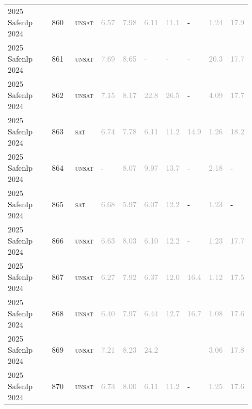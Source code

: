 \begin{center}
{\begin{longtable}{@{}llllllllll@{}}
2025 Safenlp 2024 & 860 & ~\textsc{unsat} & \textcolor{darkgray}{6.57} & \textcolor{darkgray}{7.98} & \textcolor{darkgray}{6.11} & \textcolor{darkgray}{11.1} & - & \textcolor{darkgray}{1.24} & \textcolor{darkgray}{17.9} \\
2025 Safenlp 2024 & 861 & ~\textsc{unsat} & \textcolor{darkgray}{7.69} & \textcolor{darkgray}{8.65} & - & - & - & \textcolor{darkgray}{20.3} & \textcolor{darkgray}{17.7} \\
2025 Safenlp 2024 & 862 & ~\textsc{unsat} & \textcolor{darkgray}{7.15} & \textcolor{darkgray}{8.17} & \textcolor{darkgray}{22.8} & \textcolor{darkgray}{26.5} & - & \textcolor{darkgray}{4.09} & \textcolor{darkgray}{17.7} \\
2025 Safenlp 2024 & 863 & ~\textsc{sat} & \textcolor{darkgray}{6.74} & \textcolor{darkgray}{7.78} & \textcolor{darkgray}{6.11} & \textcolor{darkgray}{11.2} & \textcolor{darkgray}{14.9} & \textcolor{darkgray}{1.26} & \textcolor{darkgray}{18.2} \\
2025 Safenlp 2024 & 864 & ~\textsc{unsat} & - & \textcolor{darkgray}{8.07} & \textcolor{darkgray}{9.97} & \textcolor{darkgray}{13.7} & - & \textcolor{darkgray}{2.18} & - \\
2025 Safenlp 2024 & 865 & ~\textsc{sat} & \textcolor{darkgray}{6.68} & \textcolor{darkgray}{5.97} & \textcolor{darkgray}{6.07} & \textcolor{darkgray}{12.2} & - & \textcolor{darkgray}{1.23} & - \\
2025 Safenlp 2024 & 866 & ~\textsc{unsat} & \textcolor{darkgray}{6.63} & \textcolor{darkgray}{8.03} & \textcolor{darkgray}{6.10} & \textcolor{darkgray}{12.2} & - & \textcolor{darkgray}{1.23} & \textcolor{darkgray}{17.7} \\
2025 Safenlp 2024 & 867 & ~\textsc{unsat} & \textcolor{darkgray}{6.27} & \textcolor{darkgray}{7.92} & \textcolor{darkgray}{6.37} & \textcolor{darkgray}{12.0} & \textcolor{darkgray}{16.4} & \textcolor{darkgray}{1.12} & \textcolor{darkgray}{17.5} \\
2025 Safenlp 2024 & 868 & ~\textsc{unsat} & \textcolor{darkgray}{6.40} & \textcolor{darkgray}{7.97} & \textcolor{darkgray}{6.44} & \textcolor{darkgray}{12.7} & \textcolor{darkgray}{16.7} & \textcolor{darkgray}{1.08} & \textcolor{darkgray}{17.6} \\
2025 Safenlp 2024 & 869 & ~\textsc{unsat} & \textcolor{darkgray}{7.21} & \textcolor{darkgray}{8.23} & \textcolor{darkgray}{24.2} & - & - & \textcolor{darkgray}{3.06} & \textcolor{darkgray}{17.8} \\
2025 Safenlp 2024 & 870 & ~\textsc{unsat} & \textcolor{darkgray}{6.73} & \textcolor{darkgray}{8.00} & \textcolor{darkgray}{6.11} & \textcolor{darkgray}{11.2} & - & \textcolor{darkgray}{1.25} & \textcolor{darkgray}{17.6} \\

\end{longtable}}
\end{center}
